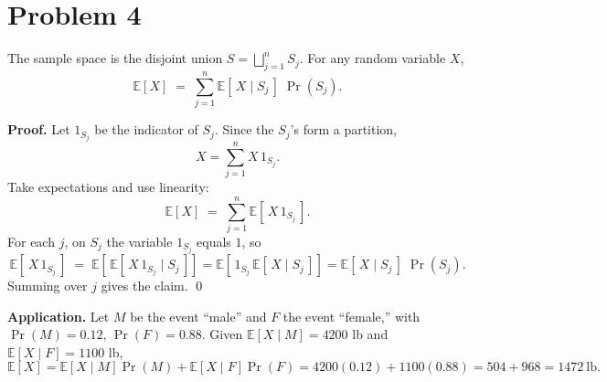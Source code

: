\section*{Problem 4}

The sample space is the disjoint union $S = \bigsqcup_{j=1}^n S_j$. For any random variable $X$,
\[
\mathbb{E}[X] \;=\; \sum_{j=1}^n \mathbb{E}[\,X \mid S_j\,]\;\Pr(S_j).
\]

\textbf{Proof.}
Let $1_{S_j}$ be the indicator of $S_j$. Since the $S_j$'s form a partition,
\[
X=\sum_{j=1}^n X\,1_{S_j}.
\]
Take expectations and use linearity:
\[
\mathbb{E}[X] \;=\; \sum_{j=1}^n \mathbb{E}[\,X\,1_{S_j}\,].
\]
For each $j$, on $S_j$ the variable $1_{S_j}$ equals $1$, so
\[
\mathbb{E}[\,X\,1_{S_j}\,] \;=\; \mathbb{E}\!\left[\,\mathbb{E}[\,X\,1_{S_j}\mid S_j\,]\right]
= \mathbb{E}\!\left[\,1_{S_j}\,\mathbb{E}[\,X\mid S_j\,]\right]
= \mathbb{E}[\,X\mid S_j\,]\;\Pr(S_j).
\]
Summing over $j$ gives the claim. \qed

\bigskip
\textbf{Application.}
Let $M$ be the event “male” and $F$ the event “female,” with $\Pr(M)=0.12$, $\Pr(F)=0.88$.
Given $\mathbb{E}[X\mid M]=4200$ lb and $\mathbb{E}[X\mid F]=1100$ lb,
\[
\mathbb{E}[X]
= \mathbb{E}[X\mid M]\Pr(M)+\mathbb{E}[X\mid F]\Pr(F)
= 4200(0.12)+1100(0.88)
= 504+968
= \boxed{1472\ \text{lb}}.
\]
